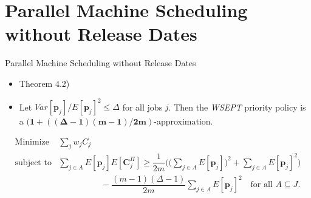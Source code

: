 \documentclass{beamer}
\begin{document}
\section{Parallel Machine Scheduling without Release Dates}
\begin{frame}{Parallel Machine Scheduling without Release Dates}
    \begin{itemize}
        \justifying
        \item Theorem 4.2)
        \item[] Let $Var[\pmb{p}_j]/E[\pmb{p}_j]^2 \leq \Delta$ for all jobs $j$. Then the \textit{WSEPT} priority policy is a $\pmb{(1+((\Delta-1)(m-1)/2m)}$-approximation.
        \vspace{0.8cm}
    \end{itemize}
		\begin{equation*}
		\begin{array}{lll}
			\text{Minimize}& \sum\limits_{j} w_{j}C_j\\[8pt]
            \text{subject to}
            &\sum\limits_{j\in A}E[\pmb{p}_j]E[\pmb{C}_j^\Pi] 
            \geq \dfrac{1}{2m} \Bigg(\Bigg(  \sum\limits_{j\in A}E[\pmb{p}_j]\Bigg)^2 + \sum\limits_{j\in A}E[\pmb{p}_j]^2 \Bigg)\\[20pt]
            & \qquad\qquad\quad - \dfrac{(m-1)(\Delta-1)}{2m}\sum\limits_{j\in A}E[\pmb{p}_j]^2
            \quad \text{for all } A \subseteq J. \\[8pt]
		\end{array}
		\end{equation*}    
        \vspace{1.3cm}    
\end{frame}
\end{document}
